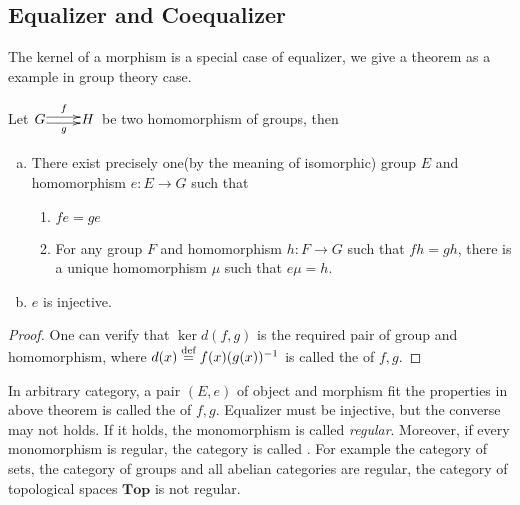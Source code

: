 \subsection{Equalizer and Coequalizer}
The kernel of a morphism is a special case of equalizer, we give a theorem as a example in group theory case.
\begin{thm}\label{5}
  Let $\xymatrix@1{G\ar@<0.5ex>[r]^{f}\ar@<-0.5ex>[r]_{g} &H}$ be two homomorphism of groups, then
  \begin{enumerate}[a)]
    \setlength{\itemindent}{2ex}
    \item There exist precisely one(by the meaning of isomorphic) group $E$ and homomorphism $e\colon E\to G$ such that
      \begin{enumerate}[1)]
       \setlength{\itemindent}{2ex}
       \item $fe=ge$
       \item For any group $F$ and homomorphism $h\colon F\to G$ such that $fh=gh$, there is a unique homomorphism $\mu$ such that $e\mu=h$.
      \end{enumerate}
    \item $e$ is injective.
  \end{enumerate}
\end{thm}
\begin{proof}
One can verify that $\ker d(f,g)$ is the required pair of group and homomorphism, where $d(x)\stackrel{\text{def}}{=} f(x)(g(x))^{-1}$ is called the  of $f,g$.
\end{proof}
In arbitrary category, a pair $(E,e)$ of object and morphism fit the properties in above theorem is called the  of $f,g$. Equalizer must be injective, but the converse may not holds. If it holds, the monomorphism is called \emph{\red  regular}. Moreover, if every monomorphism is regular, the category is called . For example the category of sets, the category of groups and all abelian categories are regular, the category of topological spaces $\mathbf{Top}$ is not regular.

